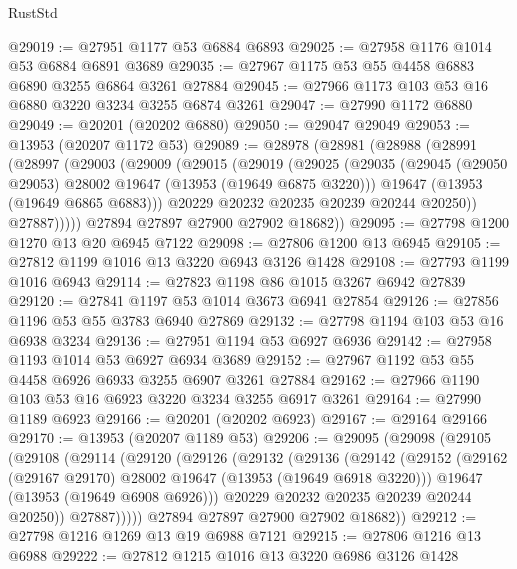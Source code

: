 \begin{lexlean}{RustStd}
\begin{coremodule}
@29019 := @27951 @1177 @53 @6884 @6893
@29025 := @27958 @1176 @1014 @53 @6884 @6891 @3689
@29035 := @27967 @1175 @53 @55 @4458 @6883 @6890 @3255 @6864 @3261 @27884
@29045 := @27966 @1173 @103 @53 @16 @6880 @3220 @3234 @3255 @6874 @3261
@29047 := @27990 @1172 @6880
@29049 := @20201 (@20202 @6880)
@29050 := @29047 @29049
@29053 := @13953 (@20207 @1172 @53)
@29089 := @28978
    (@28981
      (@28988
        (@28991
          (@28997
            (@29003
              (@29009
                (@29015
                  (@29019
                    (@29025
                      (@29035
                        (@29045 (@29050 @29053) @28002 @19647 (@13953 (@19649 @6875 @3220)))
                        @19647
                        (@13953 (@19649 @6865 @6883)))
                      @20229
                      @20232
                      @20235
                      @20239
                      @20244
                      @20250))
                  @27887)))))
        @27894
        @27897
        @27900
        @27902
        @18682))
@29095 := @27798 @1200 @1270 @13 @20 @6945 @7122
@29098 := @27806 @1200 @13 @6945
@29105 := @27812 @1199 @1016 @13 @3220 @6943 @3126 @1428
@29108 := @27793 @1199 @1016 @6943
@29114 := @27823 @1198 @86 @1015 @3267 @6942 @27839
@29120 := @27841 @1197 @53 @1014 @3673 @6941 @27854
@29126 := @27856 @1196 @53 @55 @3783 @6940 @27869
@29132 := @27798 @1194 @103 @53 @16 @6938 @3234
@29136 := @27951 @1194 @53 @6927 @6936
@29142 := @27958 @1193 @1014 @53 @6927 @6934 @3689
@29152 := @27967 @1192 @53 @55 @4458 @6926 @6933 @3255 @6907 @3261 @27884
@29162 := @27966 @1190 @103 @53 @16 @6923 @3220 @3234 @3255 @6917 @3261
@29164 := @27990 @1189 @6923
@29166 := @20201 (@20202 @6923)
@29167 := @29164 @29166
@29170 := @13953 (@20207 @1189 @53)
@29206 := @29095
    (@29098
      (@29105
        (@29108
          (@29114
            (@29120
              (@29126
                (@29132
                  (@29136
                    (@29142
                      (@29152
                        (@29162 (@29167 @29170) @28002 @19647 (@13953 (@19649 @6918 @3220)))
                        @19647
                        (@13953 (@19649 @6908 @6926)))
                      @20229
                      @20232
                      @20235
                      @20239
                      @20244
                      @20250))
                  @27887)))))
        @27894
        @27897
        @27900
        @27902
        @18682))
@29212 := @27798 @1216 @1269 @13 @19 @6988 @7121
@29215 := @27806 @1216 @13 @6988
@29222 := @27812 @1215 @1016 @13 @3220 @6986 @3126 @1428

\end{coremodule}
\end{lexlean}
